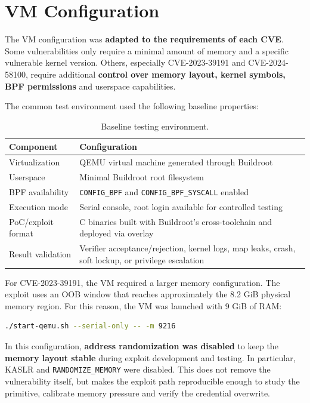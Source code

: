 \documentclass{report}
\begin{document}
    \section{VM Configuration}

    The VM configuration was \textbf{adapted to the requirements of each CVE}. Some vulnerabilities only require a minimal amount of memory and a specific vulnerable kernel version. Others, especially CVE-2023-39191 and CVE-2024-58100, require additional \textbf{control over memory layout, kernel symbols, BPF permissions} and userspace capabilities.

    The common test environment used the following baseline properties:

    \begin{table}[H]
    \centering
    \begin{tabularx}{\textwidth}{|l|X|}
    \hline
    \textbf{Component} & \textbf{Configuration} \\
    \hline
    Virtualization & QEMU virtual machine generated through Buildroot \\
    \hline
    Userspace & Minimal Buildroot root filesystem \\
    \hline
    BPF availability & \texttt{CONFIG\_BPF} and \texttt{CONFIG\_BPF\_SYSCALL} enabled \\
    \hline
    Execution mode & Serial console, root login available for controlled testing \\
    \hline
    PoC/exploit format & C binaries built with Buildroot's cross-toolchain and deployed via overlay \\
    \hline
    Result validation & Verifier acceptance/rejection, kernel logs, map leaks, crash, soft lockup, or privilege escalation \\
    \hline
    \end{tabularx}
    \caption{Baseline testing environment.}
    \end{table}

    For CVE-2023-39191, the VM required a larger memory configuration. The exploit uses an OOB window that reaches approximately the 8.2 GiB physical memory region. For this reason, the VM was launched with 9 GiB of RAM:

      \begin{lstlisting}[language=bash, caption={QEMU memory configuration used for CVE-2023-39191.}]
      ./start-qemu.sh --serial-only -- -m 9216
      \end{lstlisting}

    In this configuration, \textbf{address randomization was disabled} to keep the \textbf{memory layout stable} during exploit development and testing. In particular, KASLR and \texttt{RANDOMIZE\_MEMORY} were disabled. This does not remove the vulnerability itself, but makes the exploit path reproducible enough to study the primitive, calibrate memory pressure and verify the credential overwrite.
\end{document}
